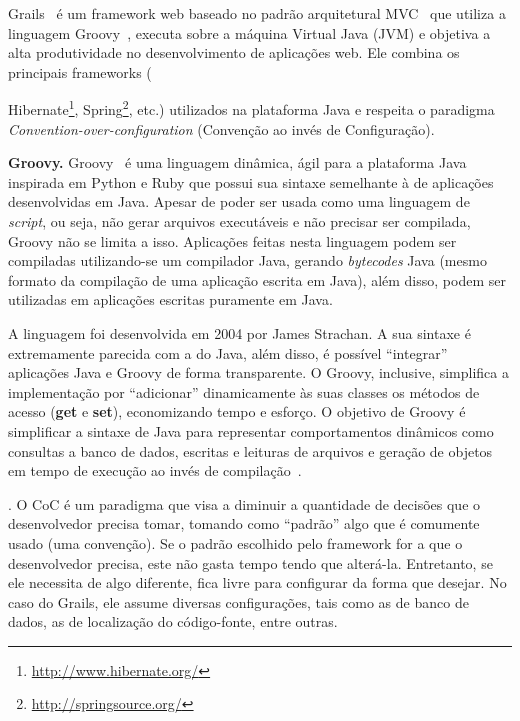 Grails~\cite{Grails}  é   um  framework  web  baseado   no  padrão  arquitetural
MVC~\cite{KP88} que  utiliza a  linguagem Groovy~\cite{Groovy}, executa  sobre a
máquina Virtual Java (JVM) e objetiva a alta produtividade no desenvolvimento de
aplicações      web.      Ele      combina     os      principais     frameworks
({Hibernate\footnote{\url{http://www.hibernate.org/}},
Spring\footnote{\url{http://springsource.org/}}, etc.)  utilizados na plataforma
Java e  respeita o  paradigma {\it Convention-over-configuration}  (Convenção ao
invés de Configuração).

\vspace{0.3cm}

\begin{cBox}
{\bf  Groovy.}   Groovy~\cite{Groovy} é  uma  linguagem  dinâmica,  ágil para  a
plataforma Java inspirada  em Python e Ruby que possui  sua sintaxe semelhante à
de  aplicações  desenvolvidas em  Java.   Apesar de  poder  ser  usada como  uma
linguagem  de  {\it script},  ou  seja, não  gerar  arquivos  executáveis e  não
precisar ser  compilada, Groovy  não se limita  a isso. Aplicações  feitas nesta
linguagem podem  ser compiladas utilizando-se  um compilador Java,  gerando {\it
  bytecodes}  Java (mesmo  formato da  compilação  de uma  aplicação escrita  em
Java),  além disso,  podem ser  utilizadas em  aplicações escritas  puramente em
Java.

A  linguagem foi  desenvolvida em  2004  por James  Strachan.  A  sua sintaxe  é
extremamente  parecida  com a  do  Java,  além  disso, é  possível  ``integrar''
aplicações Java e Groovy de  forma transparente. O Groovy, inclusive, simplifica
a implementação  por ``adicionar'' dinamicamente  às suas classes os  métodos de
acesso ({\bf  get} e {\bf  set}), economizando tempo  e esforço.  O  objetivo de
Groovy é simplificar a sintaxe de Java para representar comportamentos dinâmicos
como consultas  a banco de dados, escritas  e leituras de arquivos  e geração de
objetos em tempo de execução ao invés de compilação~\cite{Groovy}.

.  O CoC é  um paradigma que
visa  a diminuir a  quantidade de  decisões que  o desenvolvedor  precisa tomar,
tomando como ``padrão'' algo que é  comumente usado (uma convenção). Se o padrão
escolhido pelo framework for a que o desenvolvedor precisa, este não gasta tempo
tendo que alterá-la. Entretanto, se  ele necessita de algo diferente, fica livre
para configurar  da forma que  desejar. No caso  do Grails, ele  assume diversas
configurações,  tais  como   as  de  banco  de  dados,   as  de  localização  do
código-fonte, entre outras.   
\end{cBox}

}
